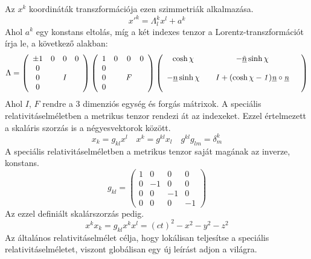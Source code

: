 \documentclass[a4paper, 12pt]{article}
\begin{document}
\vspace{0.5cm} Az $x^{k}$ koordináták transzformációja ezen szimmetriák alkalmazása.
\begin{equation*}
x'^{k} = \Lambda^{k}_{l}x^{l} + a^{k}
\end{equation*}
\vspace{0.5cm} Ahol $a^{k}$ egy konstans eltolás, míg a két indexes tenzor a Lorentz-transzformációt írja le, a következő alakban:
\begin{equation*}
\Lambda = \left(\begin{array}{cccc} \pm 1&0&0&0 \\ 0& && \\ 0 &&\it{\Large{I}} &\\ 0 && & \end{array}\right)
\left(\begin{array}{cccc} 1&0&0&0 \\ 0& & & \\ 0 & & \it{\large{F}} &\\ 0 &&&  \end{array}\right)
\left(\begin{array}{cccc} \cosh{\chi}&&-\underline{\tilde{n}}\sinh{\chi}& \\ &  && \\ -\underline{n}\sinh{\chi}&&\it{\large{I + (\cosh{\chi} - 1)\underline{n}\circ \underline{n}}}&\\ && & \end{array}\right)
\end{equation*}
\newline
Ahol $I$, $F$ rendre a 3 dimenziós egység és forgás mátrixok.  \newline
\hspace{1cm}
\vspace{0.5cm} A speciális relativitáselméletben a metrikus tenzor rendezi át az indexeket. Ezzel értelmezett a skaláris szorzás is a négyesvektorok között.
\begin{equation*}
x_{k} = g_{kl}x^{l} \quad x^{k} = g^{kl}x_{l} \quad g^{kl}g_{lm} = \delta^{k}_{m}
\end{equation*}
\vspace{0.5cm} A speciális relativitáselméletben a metrikus tenzor saját magának az inverze, konstans.
\begin{equation*}
g_{kl} = \left(\begin{array}{cccc} 1&0&0&0\\ 0&-1&0&0\\ 0&0&-1&0\\0&0&0&-1 \end{array}\right)
\end{equation*}
\vspace{0.5cm} Az ezzel definiált skalárszorzás pedig.
\begin{equation*}
x^{k}x_{k} = g_{kl}x^{k}x^{l} = (ct)^{2} - x^{2} - y^{2} - z^{2}
\end{equation*}
Az általános relativitáselmélet célja, hogy lokálisan teljesítse a speciális relativitáselméletet, viszont globálisan egy új leírást adjon a világra.
\newpage
\end{document}
